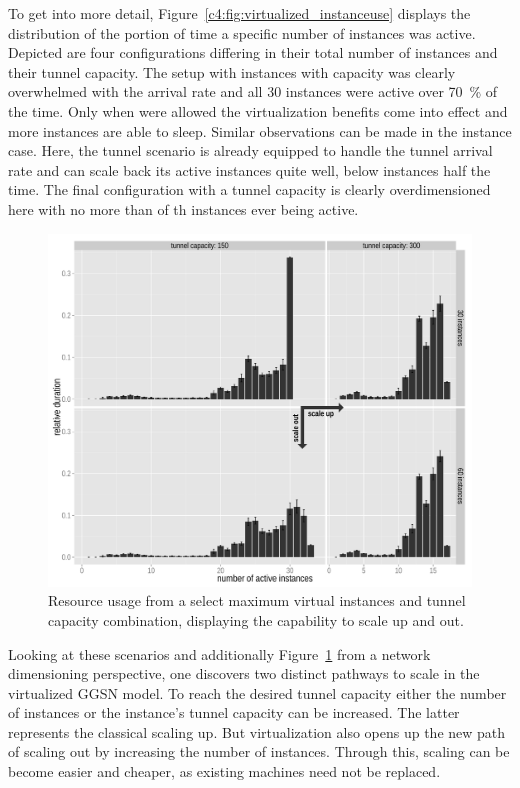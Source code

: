 To get into more detail, Figure~\ref{c4:fig:virtualized_instanceuse} displays the distribution of the portion of time a specific number of instances was active. Depicted are four configurations differing in their total number of instances and their tunnel capacity. The setup with  instances with  capacity was clearly overwhelmed with the arrival rate and all 30 instances were active over \SI{70}{\percent} of the time. Only when  were allowed the virtualization benefits come into effect and more instances are able to sleep. Similar observations can be made in the  instance case.  Here, the  tunnel scenario is already equipped to handle the tunnel arrival rate and can scale back its active instances quite well, below  instances half the time. The final configuration with a  tunnel capacity is clearly overdimensioned here with no more than  of th  instances ever being active.

\begin{figure}[htb]
  \centering
  \includegraphics[width=1.0\textwidth]{images/R-virtualized-instanceuse-barplot.pdf}
  \caption{Resource usage from a select maximum virtual instances and tunnel capacity combination, displaying the capability to scale up and out.}
\label{c4:fig:res-usage-barplot}
\end{figure}

Looking at these scenarios and additionally Figure~\ref{c4:fig:res-usage-barplot} from a network dimensioning perspective, one discovers two distinct pathways to scale in the virtualized \gls{GGSN} model. To reach the desired tunnel capacity either the number of instances or the instance's tunnel capacity can be increased. The latter represents the classical scaling up. But virtualization also opens up the new path of scaling out by increasing the number of instances. Through this, scaling can be become easier and cheaper, as existing machines need not be replaced.



